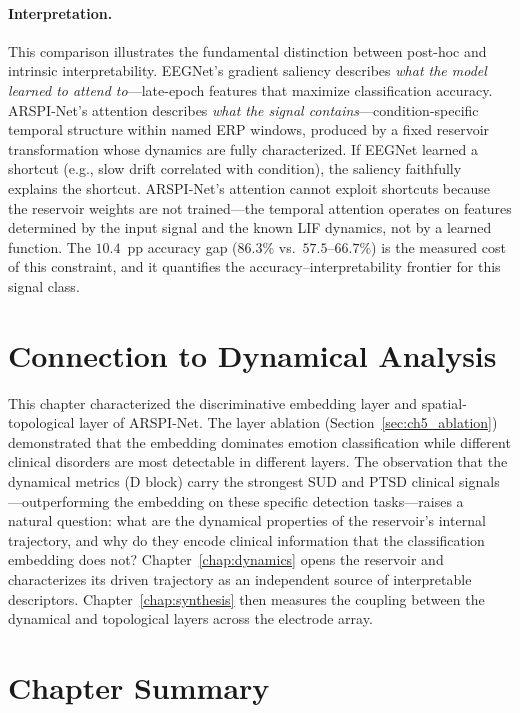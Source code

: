 \paragraph{Interpretation.} This comparison illustrates the fundamental distinction between post-hoc and intrinsic interpretability. EEGNet's gradient saliency describes \emph{what the model learned to attend to}---late-epoch features that maximize classification accuracy. ARSPI-Net's attention describes \emph{what the signal contains}---condition-specific temporal structure within named ERP windows, produced by a fixed reservoir transformation whose dynamics are fully characterized. If EEGNet learned a shortcut (e.g., slow drift correlated with condition), the saliency faithfully explains the shortcut. ARSPI-Net's attention cannot exploit shortcuts because the reservoir weights are not trained---the temporal attention operates on features determined by the input signal and the known LIF dynamics, not by a learned function. The $10.4$~pp accuracy gap ($86.3\%$ vs.\ $57.5$--$66.7\%$) is the measured cost of this constraint, and it quantifies the accuracy--interpretability frontier for this signal class.




\section{Connection to Dynamical Analysis}
\label{sec:ch5_bridge}

This chapter characterized the discriminative embedding layer and spatial-topological layer of ARSPI-Net. The layer ablation (Section~\ref{sec:ch5_ablation}) demonstrated that the embedding dominates emotion classification while different clinical disorders are most detectable in different layers. The observation that the dynamical metrics (D block) carry the strongest SUD and PTSD clinical signals---outperforming the embedding on these specific detection tasks---raises a natural question: what are the dynamical properties of the reservoir's internal trajectory, and why do they encode clinical information that the classification embedding does not? Chapter~\ref{chap:dynamics} opens the reservoir and characterizes its driven trajectory as an independent source of interpretable descriptors. Chapter~\ref{chap:synthesis} then measures the coupling between the dynamical and topological layers across the electrode array.


\section{Chapter Summary}
\label{sec:ch5_summary}

